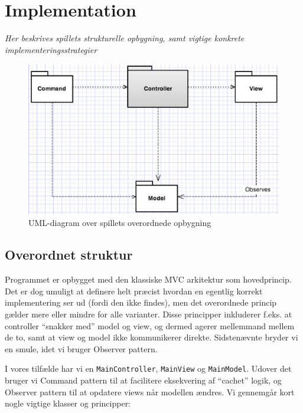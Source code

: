\documentclass[titlepage,danish]{article}
\newcommand{\code}[1]{\texttt{#1}}
\begin{document}
\section{Implementation}
\emph{Her beskrives spillets strukturelle opbygning, samt vigtige konkrete implementeringsstrategier}
\begin{figure}[h!]
  \centering
  \includegraphics[scale=0.60]{MVC.eps}
  \caption{UML-diagram over spillets overordnede opbygning}
  \label{fig:MVC_diagram}
  \end{figure}
\subsection{Overordnet struktur}
Programmet er opbygget med den klassiske MVC arkitektur som hovedprincip. Det er dog umuligt at definere helt
præcist hvordan en egentlig korrekt implementering ser ud (fordi den ikke findes), men det
overordnede princip gælder mere eller mindre for alle varianter. Disse principper inkluderer
f.eks. at controller ``snakker med'' model og view, og dermed agerer mellemmand mellem de to, samt
at view og model ikke kommunikerer direkte. Sidstenævnte bryder vi en smule, idet vi bruger Observer
pattern.

I vores tilfælde har vi en \code{MainController}, \code{MainView} og \code{MainModel}. Udover det
bruger vi Command pattern til at facilitere eksekvering af ``cachet'' logik, og Observer pattern til
at opdatere views når modellen ændres. Vi gennemgår kort nogle vigtige klasser og principper:
\end{document}
